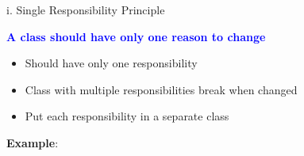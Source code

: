 \documentclass[13pt]{beamer}
\begin{document}
\begin{frame}{i. Single Responsibility Principle}
	\begin{center}
		\textcolor{blue}{\textbf{A class should have only one reason to change}}
	\end{center}
	\begin{itemize}
		\item Should have only one responsibility
		\item Class with multiple responsibilities break when changed
		\item Put each responsibility in a separate class
	\end{itemize}
	\textbf{Example}:                                        
	\begin{center}
	\end{center}
\end{frame}
\end{document}
